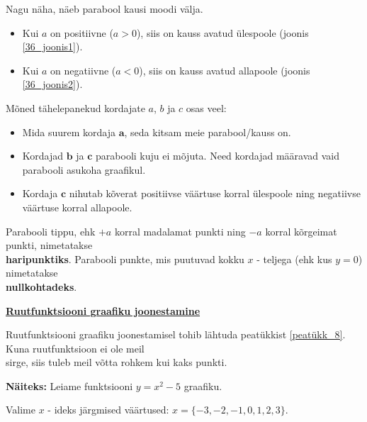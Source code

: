 \begin{center}
{{{\begin{flushleft}
\vspace{2mm}
\hspace{5mm}
Nagu näha, näeb parabool kausi moodi välja. 


\begin{itemize}
\item Kui $a$ on positiivne ($a>0$), siis on kauss avatud ülespoole (joonis \ref{36_joonis1}).
\item Kui $a$ on negatiivne ($a<0$), siis on kauss avatud allapoole (joonis \ref{36_joonis2}). 
\end{itemize}

\vspace{2mm}
\hspace{5mm}
Mõned tähelepanekud kordajate $a$, $b$ ja $c$ osas veel:

\begin{itemize}
\item Mida suurem kordaja $\mathbf{a}$, seda kitsam meie parabool/kauss on.
\item Kordajad $\mathbf{b}$ ja $\mathbf{c}$ parabooli kuju ei mõjuta. Need kordajad määravad vaid parabooli asukoha graafikul.
\item Kordaja $\mathbf{c}$ nihutab kõverat positiivse väärtuse korral ülespoole ning negatiivse väärtuse korral allapoole.
\end{itemize} 

\vspace{2mm}
\hspace{5mm}
Parabooli tippu, ehk $+a$ korral madalamat punkti ning $-a$ korral kõrgeimat punkti, nimetatakse\\ \hspace{5mm} \textbf{haripunktiks}. Parabooli punkte, mis puutuvad kokku $x$ - teljega (ehk kus $y=0$) nimetatakse\\ \hspace{5mm} \textbf{nullkohtadeks}. 

\vspace{5mm}
\hspace{5mm}
\textbf{\underline{Ruutfunktsiooni graafiku joonestamine}}

\vspace{2mm}
\hspace{5mm}
Ruutfunktsiooni graafiku joonestamisel tohib lähtuda peatükkist \ref{peatükk_8}. Kuna ruutfunktsioon ei ole meil\\ \hspace{5mm} sirge, siis tuleb meil võtta rohkem kui kaks punkti. 

\vspace{2mm}
\hspace{5mm}
\textbf{Näiteks:} Leiame funktsiooni $y=x^{2}-5$ graafiku.

\vspace{2mm}
\hspace{5mm}
Valime $x$ - ideks järgmised väärtused: $x=\{-3, -2, -1, 0, 1, 2, 3 \}$. 


\end{flushleft}
}}}
\end{center}

